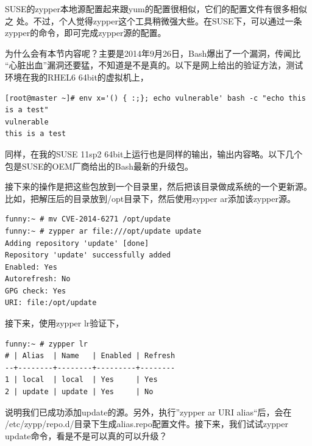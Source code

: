 SUSE的zypper本地源配置起来跟yum的配置很相似，它们的配置文件有很多相似之
处。不过，个人觉得zypper这个工具稍微强大些。在SUSE下，可以通过一条
zypper的命令，即可完成zypper源的配置。

为什么会有本节内容呢？主要是2014年9月26日，Bash爆出了一个漏洞，传闻比
“心脏出血”漏洞还要猛，不知道是不是真的。以下是网上给出的验证方法，测试
环境在我的RHEL6 64bit的虚拟机上，

\small{
\begin{verbatim}
[root@master ~]# env x='() { :;}; echo vulnerable' bash -c "echo this is a test"
vulnerable
this is a test
\end{verbatim}
}
\normalsize

同样，在我的SUSE 11sp2 64bit上运行也是同样的输出，输出内容略。以下几个
包是SUSE的OEM厂商给出的Bash最新的升级包。

\normalsize

接下来的操作是把这些包放到一个目录里，然后把该目录做成系统的一个更新源。
比如，把解压后的目录放到/opt目录下，然后使用zypper ar添加该zypper源。

\small{
\begin{verbatim}
funny:~ # mv CVE-2014-6271 /opt/update
funny:~ # zypper ar file:///opt/update update
Adding repository 'update' [done]
Repository 'update' successfully added
Enabled: Yes
Autorefresh: No
GPG check: Yes
URI: file:/opt/update
\end{verbatim}
}
\normalsize

接下来，使用zypper lr验证下，

\small{
\begin{verbatim}
funny:~ # zypper lr
# | Alias  | Name   | Enabled | Refresh
--+--------+--------+---------+--------
1 | local  | local  | Yes     | Yes    
2 | update | update | Yes     | No
\end{verbatim}
}
\normalsize

说明我们已成功添加update的源。另外，执行”zypper ar URI alias“后，会在
/etc/zypp/repo.d/目录下生成alias.repo配置文件。接下来，我们试试zypper
update命令，看是不是可以真的可以升级？

